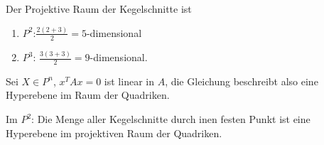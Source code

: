 \documentclass[../main.tex]{subfiles}
\begin{document}
\begin{example}
Der Projektive Raum der Kegelschnitte ist\begin{enumerate}
    \item $P^2$:$\frac{2(2+3)}2 = 5$-dimensional
    \item $P^3$: $\frac{3(3+3)}2 = 9$-dimensional.
\end{enumerate} 
\end{example}
\begin{remark}
Sei $X\in P^n$, $x^TAx = 0$ ist linear in $A$, die Gleichung beschreibt also eine Hyperebene im Raum der Quadriken.
\end{remark}
\begin{example}
Im $P^2$: Die Menge aller Kegelschnitte durch inen festen Punkt ist eine Hyperebene im projektiven Raum der Quadriken.
\end{example}
\end{document}
